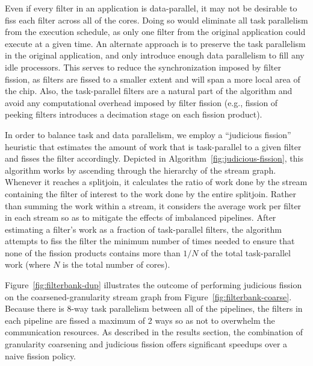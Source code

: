 Even if every filter in an application is data-parallel, it may not be
desirable to fiss each filter across all of the cores.  Doing so would
eliminate all task parallelism from the execution schedule, as only
one filter from the original application could execute at a given
time.  An alternate approach is to preserve the task parallelism in
the original application, and only introduce enough data parallelism
to fill any idle processors.  This serves to reduce the
synchronization imposed by filter fission, as filters are fissed to a
smaller extent and will span a more local area of the chip.  Also, the
task-parallel filters are a natural part of the algorithm and avoid
any computational overhead imposed by filter fission (e.g., fission of
peeking filters introduces a decimation stage on each fission
product).

In order to balance task and data parallelism, we employ a ``judicious
fission'' heuristic that estimates the amount of work that is
task-parallel to a given filter and fisses the filter accordingly.
Depicted in Algorithm~\ref{fig:judicious-fission}, this algorithm works
by ascending through the hierarchy of the stream graph.  Whenever it
reaches a splitjoin, it calculates the ratio of work done by the
stream containing the filter of interest to the work done by the
entire splitjoin.  Rather than summing the work within a stream, it
considers the average work per filter in each stream so as to mitigate
the effects of imbalanced pipelines.  After estimating a filter's work as a fraction of
task-parallel filters, the algorithm attempts to fiss the filter the
minimum number of times needed to ensure that none of the fission
products contains more than $1/N$ of the total task-parallel work
(where $N$ is the total number of cores).

Figure~\ref{fig:filterbank-dup} illustrates the outcome of performing
judicious fission on the coarsened-granularity stream graph from
Figure~\ref{fig:filterbank-coarse}.  Because there is 8-way task
parallelism between all of the pipelines, the filters in each pipeline
are fissed a maximum of 2 ways so as not to overwhelm the
communication resources.  As described in the results section, the
combination of granularity coarsening and judicious fission offers
significant speedups over a naive fission policy.
